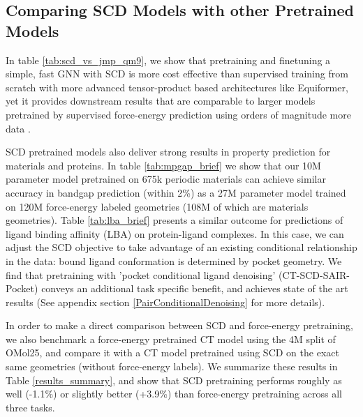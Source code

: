 \documentclass{article}
\theoremstyle{plain}
\theoremstyle{definition}
\theoremstyle{remark}
\begin{document}


\subsection{Comparing SCD Models with other Pretrained Models}
In table \ref{tab:scd_vs_jmp_qm9}, we show that pretraining and finetuning a simple, fast GNN with SCD is more cost effective than supervised training from scratch with more advanced tensor-product based architectures like Equiformer\cite{EquiformerV2_Liao2023}, yet it provides downstream results that are comparable to larger models pretrained by supervised force-energy prediction using orders of magnitude more data \cite{JMP_Shoghi2023}. 

SCD pretrained models also deliver strong results in property prediction for materials and proteins. In table \ref{tab:mpgap_brief} we show that our 10M parameter model pretrained on 675k periodic materials can achieve similar accuracy in bandgap prediction (within 2\%) as a 27M parameter model trained on 120M force-energy labeled geometries (108M of which are materials geometries). Table \ref{tab:lba_brief} presents a similar outcome for predictions of ligand binding affinity (LBA) on protein-ligand complexes. In this case, we can adjust the SCD objective to take advantage of an existing conditional relationship in the data: bound ligand conformation is determined by pocket geometry. We find that pretraining with 'pocket conditional ligand denoising' (CT-SCD-SAIR-Pocket) conveys an additional task specific benefit, and achieves state of the art results (See appendix section \ref{PairConditionalDenoising} for more details).
 
In order to make a direct comparison between SCD and force-energy pretraining, we also benchmark a force-energy pretrained CT model using the 4M split of OMol25, and compare it with a CT model pretrained using SCD on the exact same geometries (without force-energy labels). We summarize these results in Table \ref{results_summary}, and show that SCD pretraining performs roughly as well (-1.1\%) or slightly better (+3.9\%) than force-energy pretraining across all three tasks. 






\end{document}
